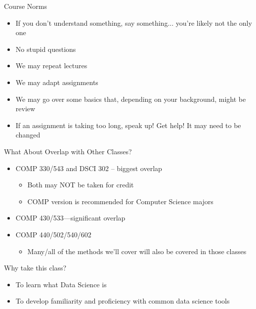 \documentclass[aspectratio=169]{beamer}
\begin{document}
\begin{frame}{Course Norms}
\begin{itemize}
\item If you don't understand something, say something... you're likely not the only one
\item No stupid questions
\item We may repeat lectures
\item We may adapt assignments
\item We may go over some basics that, depending on your background, might be review
\item If an assignment is taking too long, speak up! Get help! It may need to be changed
\end{itemize}
\end{frame}



\begin{frame}{What About Overlap with Other Classes?}

\begin{itemize}
\item COMP 330/543 and DSCI 302 -- biggest overlap
	\begin{itemize}
	\item Both may NOT be taken for credit
	\item COMP version is recommended for Computer Science majors
	\end{itemize}
\item COMP 430/533---significant overlap
\item COMP 440/502/540/602
	\begin{itemize}
	\item Many/all of the methods we'll cover will also be covered in those classes
	\end{itemize}
\end{itemize}
\end{frame}



\begin{frame}{Why take this class?}

\begin{itemize}
	\item To learn what Data Science is
	\item To develop familiarity and proficiency with common data science tools
\end{itemize}
\end{frame}
\end{document}
